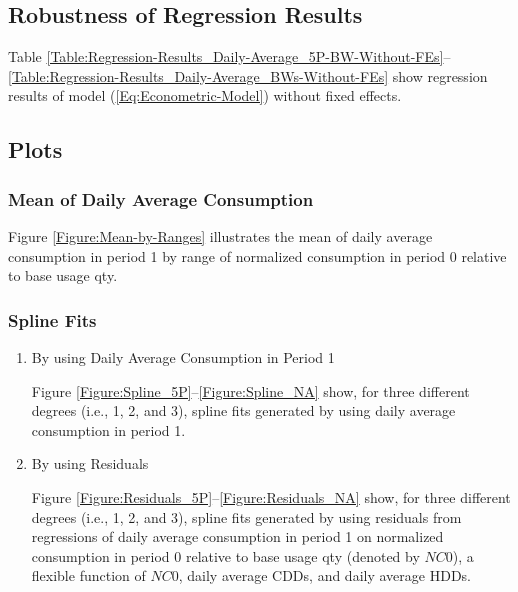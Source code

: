 \subsection{Robustness of Regression Results}
Table \ref{Table:Regression-Results_Daily-Average_5P-BW-Without-FEs}--\ref{Table:Regression-Results_Daily-Average_BWs-Without-FEs} show regression results of model (\ref{Eq:Econometric-Model}) without fixed effects.


\subsection{Plots}
\subsubsection{Mean of Daily Average Consumption}
Figure \ref{Figure:Mean-by-Ranges} illustrates the mean of daily average consumption in period 1 by range of normalized consumption in period 0 relative to base usage qty.

\subsubsection{Spline Fits}
\begin{enumerate}
    \item
    By using Daily Average Consumption in Period 1
    
    Figure \ref{Figure:Spline_5P}--\ref{Figure:Spline_NA} show, for three different degrees (i.e., 1, 2, and 3), spline fits generated by using daily average consumption in period 1. 
    
    \item
    By using Residuals
    
    Figure \ref{Figure:Residuals_5P}--\ref{Figure:Residuals_NA} show, for three different degrees (i.e., 1, 2, and 3), spline fits generated by using residuals from regressions of daily average consumption in period 1 on normalized consumption in period 0 relative to base usage qty (denoted by $NC0$), a flexible function of $NC0$, daily average CDDs, and daily average HDDs. 

\end{enumerate}



\clearpage
\begin{landscape}
    
\end{landscape}

